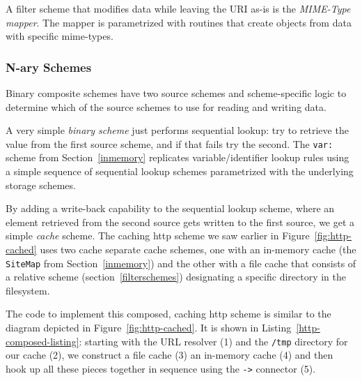 \documentclass[preprint,authoryear]{llncs}
\begin{document}


A filter scheme that modifies data while leaving the URI as-is is the \emph{MIME-Type mapper}.
The mapper is parametrized with routines that create objects from data with specific
mime-types.  


\subsubsection{N-ary Schemes}

Binary composite schemes have two source schemes and scheme-specific logic
to determine which of the source schemes to use for reading and writing data.

A very simple \emph{binary scheme} just performs sequential lookup:  try to
retrieve the value from the first source scheme, and if that fails try the second.
The {\tt var:} scheme from Section~\ref{inmemory}  replicates variable/identifier
lookup rules using a simple sequence of sequential lookup schemes parametrized
with the underlying storage schemes.

By adding a write-back capability to the sequential lookup scheme, where an element
retrieved from the second source gets written to the first source, we get a simple \emph{cache} scheme.  
The caching http scheme we saw earlier in Figure~\ref{fig:http-cached} uses two cache
separate cache schemes, one with an in-memory cache (the {\tt SiteMap} from Section~\ref{inmemory})
and the other with a file cache that consists of a relative scheme (section~\ref{filterschemes}) 
designating a specific directory in the filesystem.

The code to implement this composed, caching http scheme is similar 
to the diagram depicted in Figure~\ref{fig:http-cached}.  It is shown in Listing~\ref{http-composed-listing}:  
starting with the URL resolver (1) and the {\tt /tmp} directory for our cache (2), we construct
a file cache (3) an in-memory cache (4) and then hook up all these pieces together
in sequence using the {\tt ->} connector (5).
\end{document}
